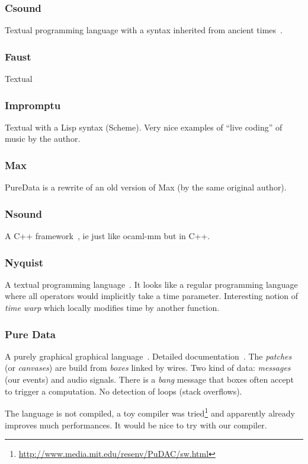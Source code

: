 \documentclass[a4paper,titlepage]{article}
\begin{document}
\subsubsection{Csound}
Textual programming language with a syntax inherited from ancient
times~\cite{csound}.

\subsubsection{Faust}
\cite{faust}
Textual

\subsubsection{Impromptu}
\cite{impromptu} Textual with a Lisp syntax (Scheme). Very nice examples of ``live
coding'' of music by the author.

\subsubsection{Max}
\cite{max}
PureData is a rewrite of an old version of Max (by the same original author).

\subsubsection{Nsound}
A C++ framework~\cite{nsound}, ie just like ocaml-mm but in C++.

\subsubsection{Nyquist}
A textual programming language~\cite{nyquist}. It looks like a regular
programming language where all operators would implicitly take a time
parameter. Interesting notion of \emph{time warp} which locally modifies time by
another function.


\subsubsection{Pure Data}
A purely graphical graphical language~\cite{puredata}. Detailed
documentation~\cite{pd-doc}. The \emph{patches} (or \emph{canvases}) are build
from \emph{boxes} linked by wires. Two kind of data: \emph{messages} (our
events) and audio signals. There is a \emph{bang} message that boxes often
accept to trigger a computation. No detection of loops (stack overflows).

The language is not compiled, a toy compiler was
tried\footnote{\url{http://www.media.mit.edu/resenv/PuDAC/sw.html}} and
apparently already improves much performances. It would be nice to try with our compiler.
\end{document}
